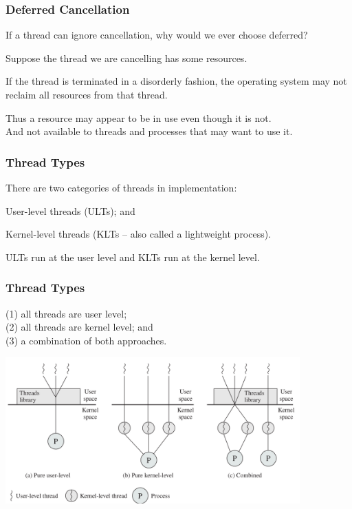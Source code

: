 \begin{frame}
\frametitle{Deferred Cancellation}

If a thread can ignore cancellation, why would we ever choose deferred? 

Suppose the thread we are cancelling has some resources. 

If the thread is terminated in a disorderly fashion, the operating system may not reclaim all resources from that thread. 

Thus a resource may appear to be in use even though it is not.\\
\quad And not available to threads and processes that may want to use it.

\end{frame}

\begin{frame}
\frametitle{Thread Types}

There are two categories of threads in implementation: 

\alert{User-level} threads (ULTs); and 

\alert{Kernel-level} threads (KLTs -- also called a lightweight process).

  ULTs run at the user level and KLTs run at the kernel level.

\end{frame}

\begin{frame}
\frametitle{Thread Types}
(1) all threads are user level;\\ (2) all threads are kernel level; and\\ (3) a combination of both approaches.

\begin{center}
	\includegraphics[width=0.85\textwidth]{images/thread-types.png}
\end{center}

\end{frame}

